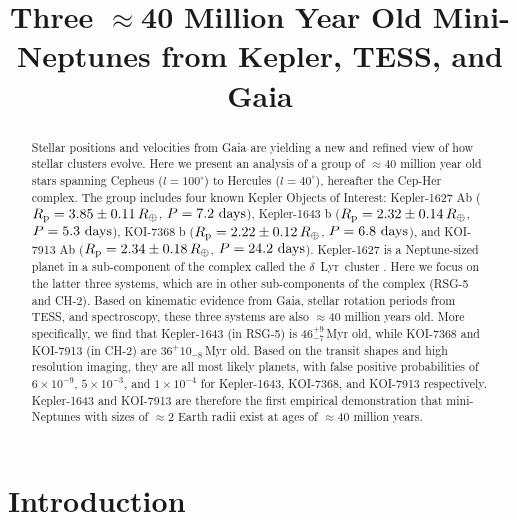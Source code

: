 \documentclass[12pt,twocolumn,linenumbers]{aastex63}
\begin{document}
\title{
  Three $\approx$40 Million Year Old Mini-Neptunes from Kepler, TESS, and Gaia
}



\begin{abstract}
  Stellar positions and velocities from Gaia are yielding a new and
  refined view of how stellar clusters evolve.
  Here we present an analysis of a group of $\approx$40 million
  year old stars spanning Cepheus ($l=100^\circ$) to Hercules
  ($l=40^\circ$), hereafter the Cep-Her complex.
  The group includes four known Kepler Objects of Interest:
  Kepler-1627 Ab ($R_{\rm p} = 3.85 \pm 0.11\,R_\oplus$, $P = 7.2\ {\rm days}$),
  Kepler-1643 b ($R_{\rm p} = 2.32 \pm 0.14\,R_\oplus$, $P = 5.3\ {\rm days}$),
  KOI-7368 b ($R_{\rm p} = 2.22 \pm 0.12\,R_\oplus$, $P = 6.8\ {\rm days}$), and
  KOI-7913 Ab ($R_{\rm p} = 2.34 \pm 0.18\,R_\oplus$, $P = 24.2\ {\rm days}$).
  Kepler-1627 is a Neptune-sized planet in a sub-component of the
  complex called the $\delta$\ Lyr\ cluster
  \citep{bouma_kep1627_2022}.
  Here we focus on the latter three systems, which are in other
  sub-components of the complex (RSG-5 and CH-2).
  Based on kinematic evidence from Gaia, stellar rotation periods from
  TESS, and spectroscopy, these three systems are also $\approx$40
  million years old.
  More specifically, we find that Kepler-1643 (in RSG-5) is
  $46^{+9}_{-7}$\,Myr old, while KOI-7368 and KOI-7913 (in CH-2) are
  $36^+{10}_{-8}$\,Myr old.
  Based on the transit shapes and high resolution imaging, they are
  all most likely planets, with false positive probabilities of
  $6\times10^{-9}$, $5\times10^{-3}$, and $1\times10^{-4}$ for
  Kepler-1643, KOI-7368, and KOI-7913 respectively.
  Kepler-1643 and KOI-7913 are therefore the first empirical
  demonstration that mini-Neptunes with sizes of $\approx$2 Earth
  radii exist at ages of $\approx$40 million years.
\end{abstract}





\section{Introduction}
\end{document}
